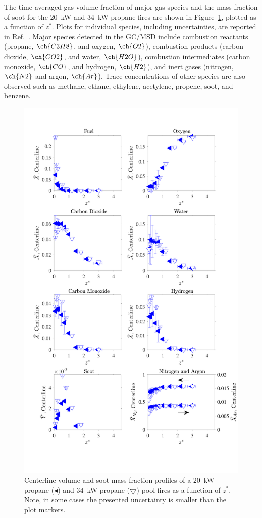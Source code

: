 \documentclass[12pt]{ussci}
\begin{document}
The time-averaged gas volume fraction of major gas species and the mass fraction of soot for the 20~kW and 34~kW propane fires are shown in Figure~\ref{fig:Fuel_Comparison}, plotted as a function of $z^*$. Plots for individual species, including uncertainties, are reported in Ref.~\cite{Falkenstein2021a}. Major species detected in the GC/MSD include combustion reactants (propane, $\ch{C3H8}$, and oxygen, $\ch{O2}$), combustion products (carbon dioxide, $\ch{CO2}$, and water, $\ch{H2O}$), combustion intermediates (carbon monoxide, $\ch{CO}$, and hydrogen, $\ch{H2}$), and inert gases (nitrogen, $\ch{N2}$ and argon, $\ch{Ar}$). Trace concentrations of other species are also observed such as methane, ethane, ethylene, acetylene, propene, soot, and benzene. 
\begin{figure}[!]
	\centering
\includegraphics[width=12.5cm,keepaspectratio]{OVERALL_Fuel_Comparison.pdf}
	\caption[Centerline volume fraction and soot mass fraction profiles]{Centerline volume and soot mass fraction profiles of a 20~kW propane ($\blacktriangleleft$) and 34~kW propane ($\bigtriangledown$) pool fires as a function of $z^*$. Note, in some cases the presented uncertainty is smaller than the plot markers.}
	\label{fig:Fuel_Comparison}
\end{figure}
\end{document}
